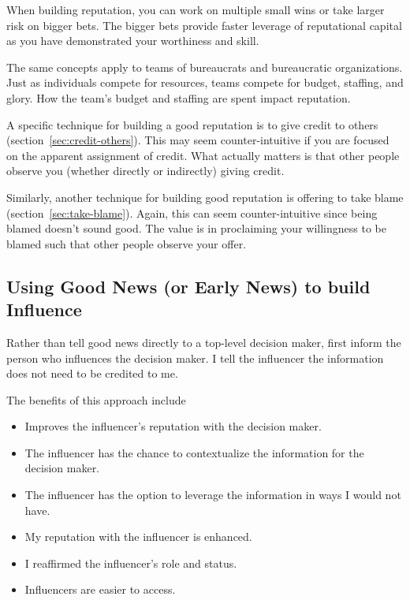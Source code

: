 When building reputation, you can work on multiple small wins or take larger risk on bigger bets. The bigger bets provide faster leverage of reputational capital as you have demonstrated your worthiness and skill. 

The same concepts apply to teams of bureaucrats and bureaucratic organizations. Just as individuals compete for resources, teams compete for budget, staffing, and glory. How the team's budget and staffing are spent impact reputation. 

A specific technique for building a good reputation is to give credit to others (section~\ref{sec:credit-others}).
This may seem counter-intuitive if you are focused on the apparent assignment of credit. What actually matters is that other people observe you (whether directly or indirectly) giving credit. 

Similarly, another technique for building good reputation is offering to take blame (section~\ref{sec:take-blame}).
Again, this can seem counter-intuitive since being blamed doesn't sound good. The value is in proclaiming your willingness to be blamed such that other people observe your offer. 

\subsection*{Using Good News (or Early News) to build Influence}

Rather than tell good news directly to a top-level decision maker, first inform the person who influences the decision maker.
I tell the influencer the information does not need to be credited to me.

The benefits of this approach include
\begin{itemize}
    \item Improves the influencer's reputation with the decision maker.
    \item The influencer has the chance to contextualize the information for the decision maker.
    \item The influencer has the option to leverage the information in ways I would not have.
    \item My reputation with the influencer is enhanced.
    \item I reaffirmed the influencer's role and status.
    \item Influencers are easier to access.
\end{itemize}

